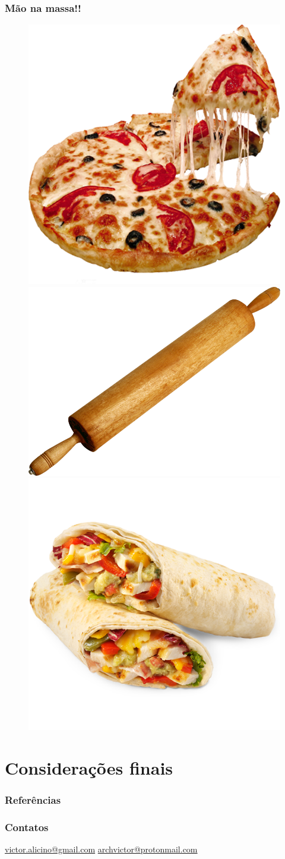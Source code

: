 \documentclass[12pt]{beamer}
\begin{document}
\begin{frame}
    \frametitle{Mão na massa!!}
    \begin{figure}
        \centering
        \includegraphics[width=.3\textwidth]{pizza.png}
        \includegraphics[width=.3\textwidth]{rolo.png}
        \includegraphics[width=.3\textwidth]{burrito.png}
    \end{figure}
\end{frame}

\section{Considerações finais}
\begin{frame}[allowframebreaks]
    \frametitle{Referências}
    
\end{frame}

\begin{frame}
    \frametitle{Contatos}
    \centering
    \url{victor.alicino@gmail.com}
    \url{archvictor@protonmail.com}
\end{frame}
\end{document}
